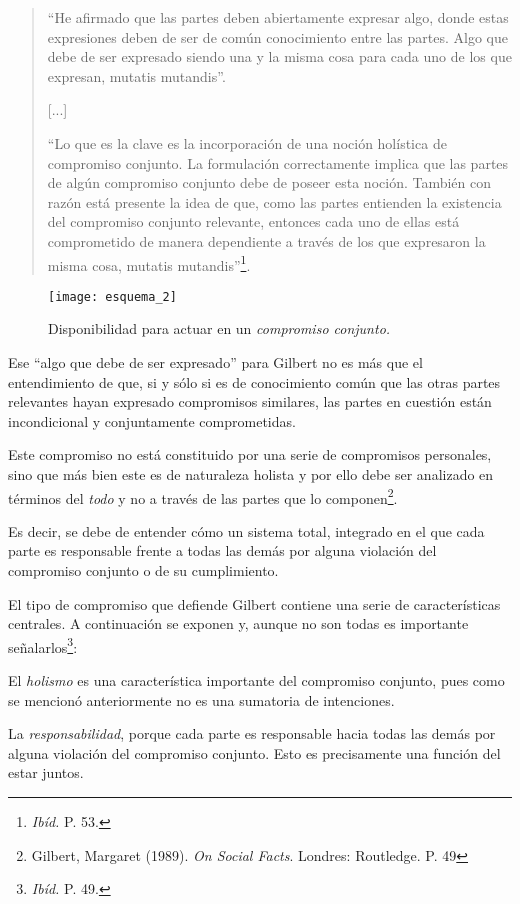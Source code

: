 \documentclass[oneside]{book}
\begin{document}
\begin{quotation}
“He afirmado que las partes deben abiertamente expresar algo, donde estas expresiones deben de ser de común conocimiento entre las partes. Algo que debe de ser expresado siendo una y la misma cosa para cada uno de los que expresan, mutatis mutandis”. 

[...]

“Lo que es la clave es la incorporación de una noción holística de compromiso conjunto. La formulación correctamente implica que las partes de algún compromiso conjunto debe de poseer esta noción. También con razón está presente la idea de que, como las partes entienden la existencia del compromiso conjunto relevante, entonces cada uno de ellas está comprometido de manera dependiente a través de los que expresaron la misma cosa, mutatis mutandis”\footnote{\textit{Ibíd.} P. 53.}.
\end{quotation}
\begin{figure}[h]
	\centering
	\texttt{[image: esquema\_2]}
	\caption{Disponibilidad para actuar en un \textit{compromiso conjunto.}}
\end{figure}

Ese “algo que debe de ser expresado” para Gilbert no es más que el entendimiento de que, si y sólo si es de conocimiento común que las otras partes relevantes hayan expresado compromisos similares, las partes en cuestión están incondicional y conjuntamente comprometidas\cite{gilbert_2}.

Este compromiso no está constituido por una serie de compromisos personales, sino que más bien este es de naturaleza holista y por ello debe ser analizado en términos del \textit{todo} y no a través de las partes que lo componen\footnote{Gilbert, Margaret (1989). \textit{On Social Facts}. Londres: Routledge. P. 49}. 

Es decir, se debe de entender cómo un sistema total, integrado en el que cada parte es responsable frente a todas las demás por alguna violación del compromiso conjunto o de su cumplimiento. 

El tipo de compromiso que defiende Gilbert contiene una serie de características centrales. A continuación se exponen y, aunque no son todas es importante señalarlos\footnote{\textit{Ibíd.} P. 49.}:

El \textit{holismo} es una característica importante del compromiso conjunto, pues como se mencionó anteriormente no es una sumatoria de intenciones.

La \textit{responsabilidad}, porque cada parte es responsable hacia todas las demás por alguna violación del compromiso conjunto. Esto es precisamente una función del estar juntos. 
\end{document}
